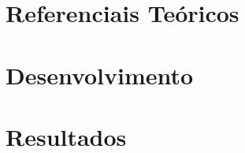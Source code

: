 \documentclass[
	12pt,						%
	openright,					%
	oneside,					%
	a4paper,					%
	english,					%
	french,						%
	spanish,					%
	brazil						%
	]{abntex2}
\begin{document}

\frenchspacing 


\imprimircapa\imprimirfolhaderosto*	%



%

%
%
%


%
%
%

\tableofcontents*
\cleardoublepage%

\textual%



\part{Referenciais Teóricos}



\part{Desenvolvimento}




\part{Resultados}


 

%
\postextual 
\end{document}
